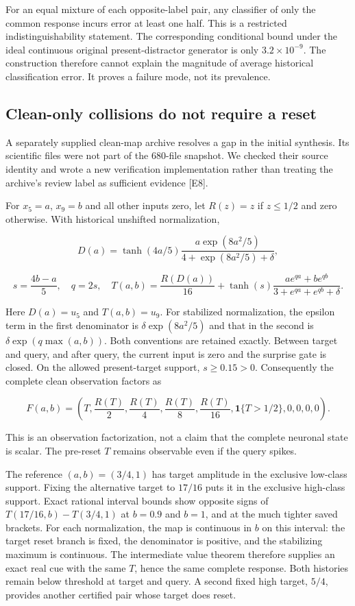 \documentclass[
  10pt,
]{article}
\begin{document}
For an equal mixture of each opposite-label pair, any classifier of only
the common response incurs error at least one half. This is a restricted
indistinguishability statement. The corresponding conditional bound
under the ideal continuous original present-distractor generator is only
\(3.2\times10^{-9}\). The construction therefore cannot explain the
magnitude of average historical classification error. It proves a
failure mode, not its prevalence.

\subsection{Clean-only collisions do not require a
reset}\label{clean-only-collisions-do-not-require-a-reset}

A separately supplied clean-map archive resolves a gap in the initial
synthesis. Its scientific files were not part of the 680-file snapshot.
We checked their source identity and wrote a new verification
implementation rather than treating the archive's review label as
sufficient evidence {[}E8{]}.

For \(x_5=a\), \(x_9=b\) and all other inputs zero, let \(R(z)=z\) if
\(z\leq1/2\) and zero otherwise. With historical unshifted
normalization,

\[
D(a)=\tanh(4a/5)\frac{a\exp(8a^2/5)}{4+\exp(8a^2/5)+\delta},
\]

\[
s=\frac{4b-a}{5},\quad q=2s,\quad
T(a,b)=\frac{R(D(a))}{16}+\tanh(s)\frac{a e^{qa}+b e^{qb}}{3+e^{qa}+e^{qb}+\delta}.
\]

Here \(D(a)=u_5\) and \(T(a,b)=u_9\). For stabilized normalization, the
epsilon term in the first denominator is \(\delta\exp(8a^2/5)\) and that
in the second is \(\delta\exp(q\max(a,b))\). Both conventions are
retained exactly. Between target and query, and after query, the current
input is zero and the surprise gate is closed. On the allowed
present-target support, \(s\geq0.15>0\). Consequently the complete clean
observation factors as

\[
F(a,b)=\left(T,\frac{R(T)}2,\frac{R(T)}4,\frac{R(T)}8,
\frac{R(T)}{16},\mathbf1\{T>1/2\},0,0,0,0\right).
\]

This is an observation factorization, not a claim that the complete
neuronal state is scalar. The pre-reset \(T\) remains observable even if
the query spikes.

The reference \((a,b)=(3/4,1)\) has target amplitude in the exclusive
low-class support. Fixing the alternative target to \(17/16\) puts it in
the exclusive high-class support. Exact rational interval bounds show
opposite signs of \(T(17/16,b)-T(3/4,1)\) at \(b=0.9\) and \(b=1\), and
at the much tighter saved brackets. For each normalization, the map is
continuous in \(b\) on this interval: the target reset branch is fixed,
the denominator is positive, and the stabilizing maximum is continuous.
The intermediate value theorem therefore supplies an exact real cue with
the same \(T\), hence the same complete response. Both histories remain
below threshold at target and query. A second fixed high target,
\(5/4\), provides another certified pair whose target does reset.
\end{document}
